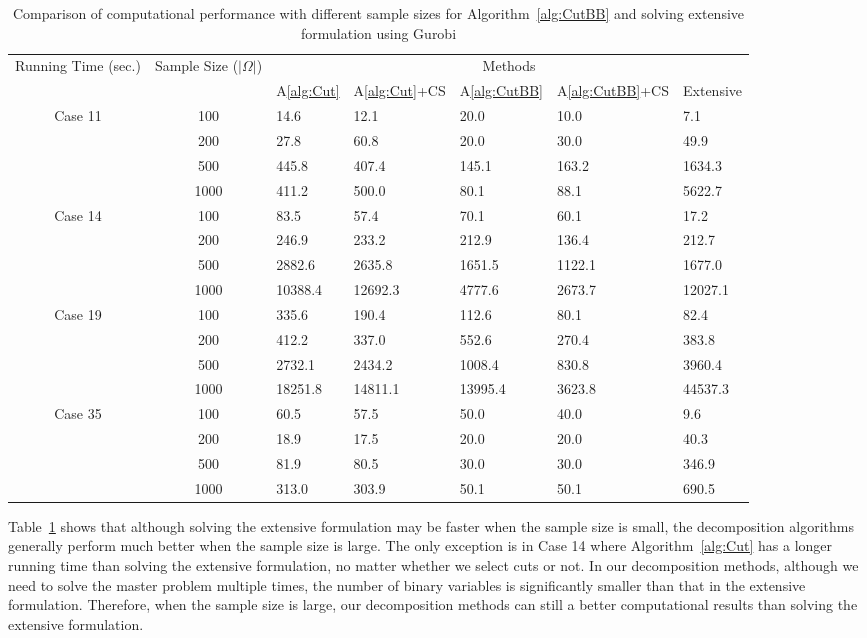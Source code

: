 \documentclass[11pt]{article}
\begin{document}
	\begin{table}[ht]
		\centering		
		\begin{tabular}{ c | c | l l l l l}
			\hline
			\multirow{2}{*}{Running Time (sec.)} & \multirow{2}{*}{Sample Size (\(|\Omega|\))} & \multicolumn{5}{c}{Methods} \\ \cline{3-7}
			& & A\ref{alg:Cut} & A\ref{alg:Cut}+CS & A\ref{alg:CutBB} & A\ref{alg:CutBB}+CS & Extensive  \\ \hline
			\multirow{4}{*}{Case 11} & 100 & 14.6 & 12.1 & 20.0 & 10.0 & 7.1 \\
			& 200 & 27.8 & 60.8 & 20.0 & 30.0 & 49.9\\
			& 500 & 445.8 & 407.4 & 145.1 & 163.2 & 1634.3\\
			& 1000 & 411.2 & 500.0 & 80.1 & 88.1 & 5622.7\\
			\hline
			\multirow{4}{*}{Case 14} & 100 & 83.5 & 57.4 & 70.1 & 60.1 & 17.2 \\
			& 200 & 246.9 & 233.2 & 212.9 & 136.4 & 212.7 \\
			& 500 & 2882.6 & 2635.8 & 1651.5 & 1122.1 & 1677.0 \\
			& 1000 & 10388.4 & 12692.3 & 4777.6 & 2673.7 & 12027.1 \\
			\hline
			\multirow{4}{*}{Case 19} & 100 & 335.6 & 190.4 & 112.6 & 80.1 & 82.4 \\
			& 200 & 412.2 & 337.0 & 552.6 & 270.4 & 383.8 \\
			& 500 & 2732.1 & 2434.2 & 1008.4 & 830.8 & 3960.4 \\
			& 1000 & 18251.8 & 14811.1 & 13995.4 & 3623.8 & 44537.3 \\
			\hline
			\multirow{4}{*}{Case 35} & 100 & 60.5 & 57.5 & 50.0 & 40.0 & 9.6 \\
			& 200 & 18.9 & 17.5 & 20.0 & 20.0 & 40.3 \\
			& 500 & 81.9 & 80.5 & 30.0 & 30.0 & 346.9 \\
			& 1000 & 313.0 & 303.9 & 50.1 & 50.1 & 690.5 \\
			\hline
		\end{tabular}
		\caption{Comparison of computational performance with different sample sizes for Algorithm~\ref{alg:CutBB} and solving extensive formulation using Gurobi}
		\label{table:time}
	\end{table}
	Table~\ref{table:time} shows that although solving the extensive formulation may be faster when the sample size is small, the decomposition algorithms generally perform much better when the sample size is large. The only exception is in Case 14 where Algorithm~\ref{alg:Cut} has a longer running time than solving the extensive formulation, no matter whether we select cuts or not. In our decomposition methods, although we need to solve the master problem multiple times, the number of binary variables is significantly smaller than that in the extensive formulation. Therefore, when the sample size is large, our decomposition methods can still a better computational results than solving the extensive formulation.\\
\end{document}
